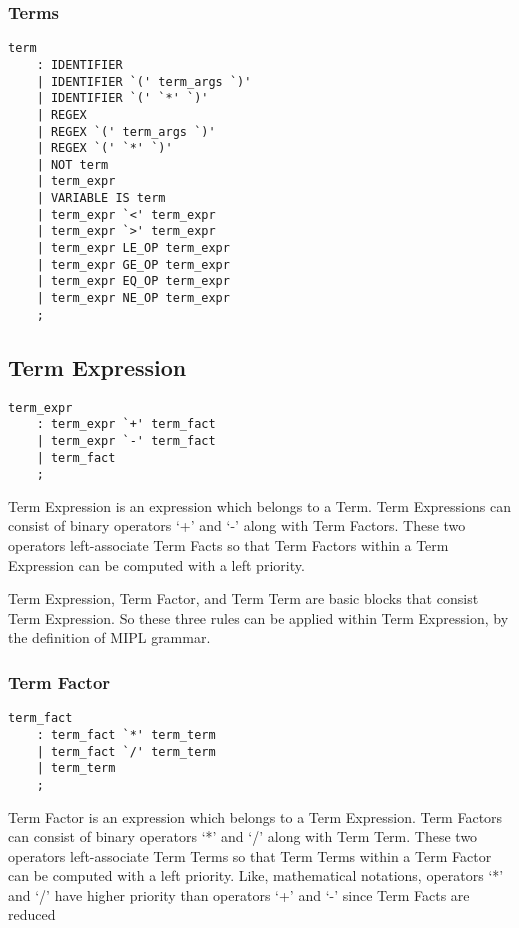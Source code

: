 \documentclass[prodmode,acmtecs]{acmsmall}
\begin{document}
\subsubsection{Terms}
\begin{lstlisting}
term
	: IDENTIFIER		
	| IDENTIFIER `(' term_args `)'
	| IDENTIFIER `(' `*' `)'
	| REGEX			
	| REGEX `(' term_args `)'
	| REGEX `(' `*' `)'	
	| NOT term		
	| term_expr		
	| VARIABLE IS term	
	| term_expr `<' term_expr
	| term_expr `>' term_expr
	| term_expr LE_OP term_expr
	| term_expr GE_OP term_expr
	| term_expr EQ_OP term_expr
	| term_expr NE_OP term_expr
	;
\end{lstlisting}

\subsection{Term Expression}
\begin{lstlisting}
term_expr
	: term_expr `+' term_fact
	| term_expr `-' term_fact
	| term_fact
	;
\end{lstlisting}

Term Expression is an expression which belongs to a Term.  Term 
Expressions can consist of binary operators `+' and `-' along with Term
Factors. These two operators left-associate Term Facts so that Term
Factors within a Term Expression can be computed with a left priority.

Term Expression, Term Factor, and Term Term are basic blocks that
consist Term Expression.  So these three rules can be applied within
Term Expression, by the definition of MIPL grammar.
\medskip

\subsubsection{Term Factor}

\begin{lstlisting}
term_fact
	: term_fact `*' term_term
	| term_fact `/' term_term
	| term_term
	;
\end{lstlisting}

Term Factor is an expression which belongs to a Term Expression.  Term 
Factors can consist of binary operators `*' and `/' along with Term
Term.  These two operators left-associate Term Terms so that Term
Terms within a Term Factor can be computed with a left priority. Like,
mathematical notations, operators `*' and `/' have higher priority than
operators `+' and `-' since Term Facts are reduced 
\medskip
\end{document}
